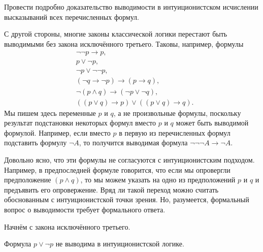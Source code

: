 \begin{problem}
Провести подробно доказательство выводимости в интуиционистском
исчислении высказываний всех перечисленных формул.
\end{problem}

С другой стороны, многие законы классической логики перестают
быть выводимыми без закона исключённого третьего. Таковы, например,
формулы
  \begin{align*}
      &\lnot\lnot p \to p,\\
      & p \lor \lnot p,\\
      &\lnot p \lor \lnot\lnot p,\\
    &(\lnot q\to \lnot p) \to (p\to q),\\
    &\lnot (p\land q) \to (\lnot p\lor\lnot q),\\
     &((p\lor q)\to p) \lor ((p \lor q)\to q).
 \end{align*}
Мы пишем здесь переменные $p$ и $q$, а не произвольные формулы,
поскольку результат подстановки некоторых формул вместо $p$ и
$q$ может быть выводимой формулой. Например, если вместо $p$ в
первую из перечисленных формул подставить формулу $\lnot A$, то
получится выводимая формула $\lnot\lnot\lnot A \to \lnot A$.

Довольно ясно, что эти формулы не согласуются с интуиционистским
подходом. Например, в предпоследней формуле говорится, что если
мы опровергли предположение $(p \land q)$, то мы можем указать
на одно из предположений $p$ и $q$ и предъявить его
опровержение. Вряд ли такой переход можно считать обоснованным с
интуиционистской точки зрения. Но, разумеется, формальный вопрос
о выводимости требует формального ответа.

Начнём с закона исключённого третьего.

\begin{theorem}
Формула $p\lor\lnot p$ не выводима в интуиционистской логике.
\end{theorem}

